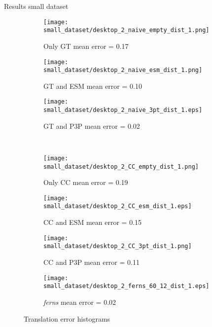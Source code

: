 \begin{frame}[t]{Results small dataset}
  \captionsetup[sub]{labelformat=empty,font=scriptsize,textfont=scriptsize,labelfont=scriptsize}
  \begin{figure}	
    \centering
    \begin{subfigure}[t]{0.2\linewidth}
      \centering
      \texttt{[image: small\_dataset/desktop\_2\_naive\_empty\_dist\_1.png]}
      \caption{Only GT mean error = 0.17}		
    \end{subfigure}
    \quad
    \begin{subfigure}[t]{0.2\linewidth}
      \centering
      \texttt{[image: small\_dataset/desktop\_2\_naive\_esm\_dist\_1.png]}
      \caption{GT and ESM mean error = 0.10}
    \end{subfigure}
    \quad
    \begin{subfigure}[t]{0.2\linewidth}
      \centering
      \texttt{[image: small\_dataset/desktop\_2\_naive\_3pt\_dist\_1.eps]}
      \caption{GT and P3P mean error = 0.02}
    \end{subfigure}
    \hfill\null
    \\
    \begin{subfigure}[t]{0.2\linewidth}
      \centering
      \texttt{[image: small\_dataset/desktop\_2\_CC\_empty\_dist\_1.png]}
      \caption{Only CC mean error = 0.19}
    \end{subfigure}
    \quad
    \begin{subfigure}[t]{0.2\linewidth}
      \centering
      \texttt{[image: small\_dataset/desktop\_2\_CC\_esm\_dist\_1.eps]}
      \caption{CC and ESM mean error = 0.15}
    \end{subfigure}
    \quad
    \begin{subfigure}[t]{0.2\linewidth}
      \centering
      \texttt{[image: small\_dataset/desktop\_2\_CC\_3pt\_dist\_1.png]}
      \caption{CC and P3P mean error = 0.11}
    \end{subfigure}
    \begin{subfigure}[t]{0.2\linewidth}
      \centering
      \texttt{[image: small\_dataset/desktop\_2\_ferns\_60\_12\_dist\_1.eps]}
      \caption{\textit{ferns} mean error = 0.02}
    \end{subfigure}
    \hfill\null
    \caption{Translation error histograms}
  \end{figure}

\end{frame}



